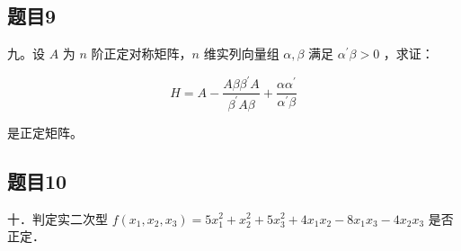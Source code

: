 \documentclass{article}
\begin{document}
\subsection{题目9}
九。设 \(A\) 为 \(n\) 阶正定对称矩阵，\(n\) 维实列向量组 \(\alpha, \beta\) 满足 \(\alpha^{\prime} \beta>0\) ，求证：

\[
H=A-\frac{A \beta \beta^{\prime} A}{\beta^{\prime} A \beta}+\frac{\alpha \alpha^{\prime}}{\alpha^{\prime} \beta}
\]

是正定矩阵。

\subsection{题目10}
十．判定实二次型 \(f\left(x_{1}, x_{2}, x_{3}\right)=5 x_{1}^{2}+x_{2}^{2}+5 x_{3}^{2}+4 x_{1} x_{2}-8 x_{1} x_{3}-4 x_{2} x_{3}\) 是否正定．
\end{document}
